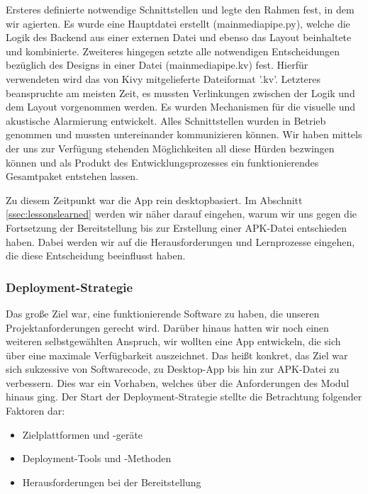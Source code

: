		\noindent Ersteres definierte notwendige Schnittstellen und legte den Rahmen fest, in dem wir agierten. Es wurde eine Hauptdatei erstellt (mainmediapipe.py), welche die Logik des Backend aus einer externen Datei und ebenso das Layout beinhaltete und kombinierte. Zweiteres hingegen setzte alle notwendigen Entscheidungen bezüglich des Designs in einer Datei (mainmediapipe.kv) fest. Hierfür verwendeten wird das von Kivy mitgelieferte Dateiformat '.kv'. Letzteres beanspruchte am meisten Zeit, es mussten Verlinkungen zwischen der Logik und dem Layout vorgenommen werden. Es wurden Mechanismen für die visuelle und akustische Alarmierung entwickelt. Alles Schnittstellen wurden in Betrieb genommen und mussten untereinander kommunizieren können. Wir haben mittels der uns zur Verfügung stehenden Möglichkeiten all diese Hürden bezwingen können und als Produkt des Entwicklungsprozesses ein funktionierendes Gesamtpaket entstehen lassen.

		Zu diesem Zeitpunkt war die App rein desktopbasiert. Im Abschnitt \ref{ssec:lessonslearned} werden wir näher darauf eingehen, warum wir uns gegen die Fortsetzung der Bereitstellung bis zur Erstellung einer APK-Datei entschieden haben. Dabei werden wir auf die Herausforderungen und Lernprozesse eingehen, die diese Entscheidung beeinflusst haben.
		
	\subsubsection{Deployment-Strategie}
	\label{sssec:deployment}
		
		Das große Ziel war, eine funktionierende Software zu haben, die unseren Projektanforderungen gerecht wird. Darüber hinaus hatten wir noch einen weiteren selbstgewählten Anspruch, wir wollten eine App entwickeln, die sich über eine maximale Verfügbarkeit auszeichnet. Das heißt konkret, das Ziel war sich sukzessive von Softwarecode, zu Desktop-App bis hin zur APK-Datei zu verbessern. Dies war ein Vorhaben, welches über die Anforderungen des Modul hinaus ging. Der Start der Deployment-Strategie stellte die Betrachtung folgender Faktoren dar:
		
		\begin{itemize}
			\item Zielplattformen und -geräte
			\item Deployment-Tools und -Methoden
			\item Herausforderungen bei der Bereitstellung
		\end{itemize}
		
